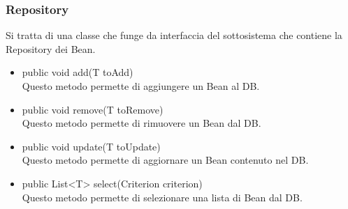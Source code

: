 \documentclass[11pt]{article}
\begin{document}
			\subsubsection{Repository}
				Si tratta di una classe che funge da interfaccia del sottosistema che contiene la Repository dei Bean.	
			\begin{itemize}
					\item public void add(T toAdd)\\
				Questo metodo permette di aggiungere un Bean al DB.
				\item public void remove(T toRemove)\\
				Questo metodo permette di rimuovere un Bean dal DB. 
				\item public void update(T toUpdate) \\
				Questo metodo permette di aggiornare un Bean contenuto nel DB.
				\item public List<T> select(Criterion criterion)\\
				Questo metodo permette di selezionare una lista di Bean dal DB.
			\end{itemize}
\end{document}
